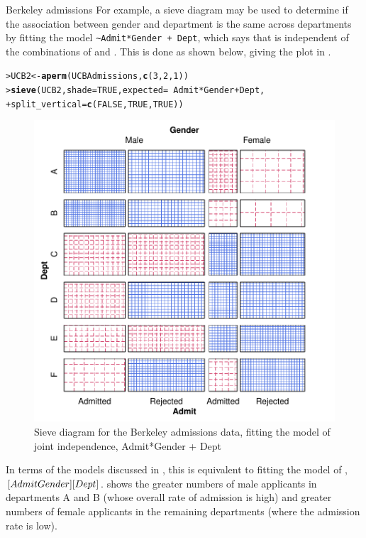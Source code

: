 \documentclass[10pt,krantz2]{krantz}\usepackage[]{graphicx}\usepackage[]{color}
\makeatletter
\newcommand{\hlnum}[1]{\textcolor[rgb]{0.686,0.059,0.569}{#1}}%
\newcommand{\hlopt}[1]{\textcolor[rgb]{0,0,0}{#1}}%
\newcommand{\hlstd}[1]{\textcolor[rgb]{0.345,0.345,0.345}{#1}}%
\newcommand{\hlkwb}[1]{\textcolor[rgb]{0.69,0.353,0.396}{#1}}%
\newcommand{\hlkwc}[1]{\textcolor[rgb]{0.333,0.667,0.333}{#1}}%
\newcommand{\hlkwd}[1]{\textcolor[rgb]{0.737,0.353,0.396}{\textbf{#1}}}%
\newenvironment{kframe}{%
 \def\at@end@of@kframe{}%
 \ifinner\ifhmode%
  \def\at@end@of@kframe{\end{minipage}}%
  \begin{minipage}{\columnwidth}%
 \fi\fi%
 \def\FrameCommand##1{\hskip\@totalleftmargin \hskip-\fboxsep
 \colorbox{shadecolor}{##1}\hskip-\fboxsep
     \hskip-\linewidth \hskip-\@totalleftmargin \hskip\columnwidth}%
 \MakeFramed {\advance\hsize-\width
   \@totalleftmargin\z@ \linewidth\hsize
   \@setminipage}}%
 {\par\unskip\endMakeFramed%
 \at@end@of@kframe}
\newenvironment{knitrout}{}{} %
\renewenvironment{knitrout}{\small\renewcommand{\baselinestretch}{.85}}{} %
\makeatother
\begin{document}
\begin{Example}[berkeley3]{Berkeley admissions}
For example, a sieve diagram may be used to determine if the association
between gender and department is the same across departments
by fitting the model \verb|~Admit*Gender + Dept|, which
says that  is independent of the combinations of 
and .  This is done as shown below, giving the plot in
.

\begin{knitrout}
\color{fgcolor}\begin{kframe}
\begin{alltt}
\hlstd{> }\hlstd{UCB2} \hlkwb{<-} \hlkwd{aperm}\hlstd{(UCBAdmissions,} \hlkwd{c}\hlstd{(}\hlnum{3}\hlstd{,}\hlnum{2}\hlstd{,}\hlnum{1}\hlstd{))}
\hlstd{> }\hlkwd{sieve}\hlstd{(UCB2,} \hlkwc{shade}\hlstd{=}\hlnum{TRUE}\hlstd{,} \hlkwc{expected}\hlstd{=}\hlopt{~}\hlstd{Admit}\hlopt{*}\hlstd{Gender} \hlopt{+} \hlstd{Dept,}
\hlstd{+ }      \hlkwc{split_vertical}\hlstd{=}\hlkwd{c}\hlstd{(}\hlnum{FALSE}\hlstd{,}\hlnum{TRUE}\hlstd{,}\hlnum{TRUE}\hlstd{))}
\end{alltt}
\end{kframe}\begin{figure}[!htbp]

\centerline{\includegraphics[width=.6\textwidth]{ch04/fig/berkeley-sieve2-1} }

\caption[Sieve diagram for the Berkeley admissions data, fitting the model of joint independence, Admit*Gender + Dept]{Sieve diagram for the Berkeley admissions data, fitting the model of joint independence, Admit*Gender + Dept\label{fig:berkeley-sieve2}}
\end{figure}


\end{knitrout}
In terms of the \loglin models discussed in
, this is equivalent to fitting the model
of , $[AdmitGender] [Dept]$.
 shows the greater numbers of
male applicants in departments A and B
(whose overall rate of admission is high) and greater numbers of female
applicants in the remaining departments (where the admission rate is low).

\end{Example}
\end{document}
